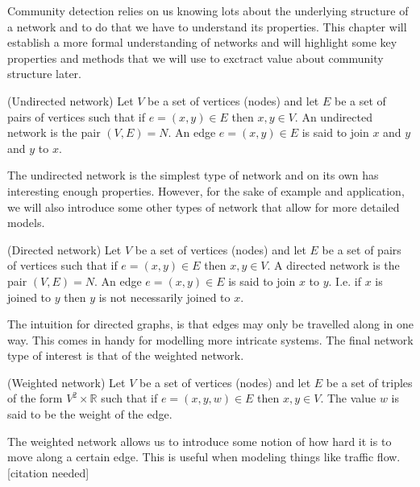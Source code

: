 Community detection relies on us knowing lots about the underlying structure of a network and to do that we have to understand its properties. This chapter will establish a more formal understanding of networks and will highlight some key properties and methods that we will use to exctract value about community structure later.

\begin{definition}{(Undirected network)}
    Let $V$ be a set of vertices (nodes) and let $E$ be a set of pairs of vertices such that if $e = (x, y) \in E$ then $x, y \in V$. An undirected network is the pair $(V, E) = N$. An edge $e = (x, y) \in E$ is said to join $x$ and $y$ and $y$ to $x$.\cite[1]{oxford:renaud_notes}\label{def:undirected_network}
\end{definition}

The undirected network is the simplest type of network and on its own has interesting enough properties. However, for the sake of example and application, we will also introduce some other types of network that allow for more detailed models.


\begin{definition}{(Directed network)}
    Let $V$ be a set of vertices (nodes) and let $E$ be a set of pairs of vertices such that if $e = (x, y) \in E$ then $x, y \in V$. A directed network is the pair $(V, E) = N$. An edge $e = (x, y) \in E$ is said to join $x$ to $y$. I.e. if $x$ is joined to $y$ then $y$ is not necessarily joined to $x$.\cite[1]{oxford:renaud_notes}\label{def:directed_network}
\end{definition}

The intuition for directed graphs, is that edges may only be travelled along in one way. This comes in handy for modelling more intricate systems. The final network type of interest is that of the weighted network.

\begin{definition}{(Weighted network)}
    Let $V$ be a set of vertices (nodes) and let $E$ be a set of triples of the form $V^2 \times \mathbb{R}$ such that if $e = (x, y, w) \in E$ then $x, y \in V$. The value $w$ is said to be the weight of the edge.\cite[1]{oxford:renaud_notes}\label{def:weighted_network}
\end{definition}

The weighted network allows us to introduce some notion of how hard it is to move along a certain edge. This is useful when modeling things like traffic flow. [citation needed]


